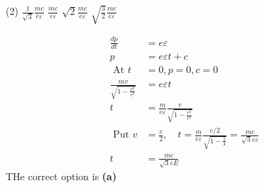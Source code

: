 \begin{enumerate}
\begin{tasks}(2)
	\task[\textbf{A.}] $\frac{1}{\sqrt{3}} \frac{m c}{e \varepsilon}$
	\task[\textbf{B.}]$\frac{m c}{e \varepsilon}$
	\task[\textbf{C.}]$\sqrt{2} \frac{m c}{e \varepsilon}$
	\task[\textbf{D.}]$\sqrt{\frac{3}{2}} \frac{m c}{e \varepsilon}$
\end{tasks}
\begin{answer}
\begin{align*}
\frac{d p}{d t}&=e \varepsilon\\
p&=e \varepsilon t+c\\
\text { At } t&=0, p=0, c=0\\
\frac{m v}{\sqrt{1-\frac{v^{2}}{c^{2}}}}&=e \varepsilon t\\
t&=\frac{m}{e \varepsilon} \frac{v}{\sqrt{1-\frac{v^{2}}{c^{2}}}}\\
\text { Put } v&=\frac{c}{2}, \quad t=\frac{m}{e \varepsilon} \frac{c / 2}{\sqrt{1-\frac{1}{4}}}=\frac{m c}{\sqrt{3} e \varepsilon}\\
t&=\frac{m c}{\sqrt{3} e E}
\end{align*}
THe correct option is \textbf{(a)}	
\end{answer}
\end{enumerate}